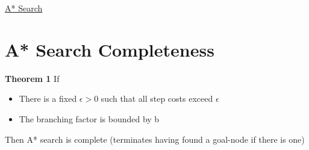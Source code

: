 \documentclass{article}[18pt]
\begin{document}
\begin{center}
\underline{\huge A* Search}
\end{center}
\section{A* Search Completeness}
\textbf{Theorem 1}
If
\begin{itemize}
	\item There is a fixed $\epsilon>0$ such that all step costs exceed $\epsilon$
	\item The branching factor is bounded by b
\end{itemize}
Then A* search is complete (terminates having found a goal-node if there is one)
\end{document}
